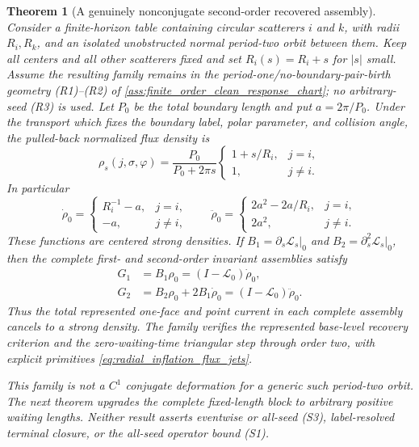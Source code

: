 \documentclass[11pt]{amsart}
\theoremstyle{compactplain}
\newtheorem{theorem}{Theorem}[section]
\theoremstyle{compactdefinition}
\theoremstyle{compactremark}
\newcommand{\Ltransfer}{\mathscr L}
\begin{document}
\begin{theorem}[A genuinely nonconjugate second-order recovered assembly]
\label{thm:radial_inflation_second_order_recovery}
Consider a finite-horizon table containing circular scatterers \(i\) and
\(k\), with radii \(R_i,R_k\), and an isolated unobstructed normal period-two
orbit between them.  Keep all centers and all other scatterers fixed and set
\(R_i(s)=R_i+s\) for \(|s|\) small.  Assume the resulting family remains in
the period-one/no-boundary-pair-birth geometry (R1)--(R2) of
\cref{ass:finite_order_clean_response_chart}; no arbitrary-seed (R3) is used.
Let \(P_0\) be the total
boundary length and put \(a=2\pi/P_0\).  Under the transport which fixes the
boundary label, polar parameter, and collision angle, the pulled-back
normalized flux density is
\begin{equation}
\label{eq:radial_inflation_flux_density}
 \rho_s(j,\sigma,\varphi)
 =\frac{P_0}{P_0+2\pi s}
 \begin{cases}
  1+s/R_i,&j=i,\\
  1,&j\ne i.
 \end{cases}
\end{equation}
In particular
\begin{equation}
\label{eq:radial_inflation_flux_jets}
 \dot\rho_0=
 \begin{cases}R_i^{-1}-a,&j=i,\\-a,&j\ne i,
 \end{cases}
 \qquad
 \ddot\rho_0=
 \begin{cases}2a^2-2a/R_i,&j=i,\\2a^2,&j\ne i.
 \end{cases}
\end{equation}
These functions are centered strong densities.  If
\(B_1=\partial_s\Ltransfer_s|_0\) and
\(B_2=\partial_s^2\Ltransfer_s|_0\), then the complete first- and second-order
invariant assemblies satisfy
\begin{align}
 G_1&=B_1\rho_0=(I-\Ltransfer_0)\dot\rho_0,
 \label{eq:radial_inflation_first_recovery}\\
 G_2&=B_2\rho_0+2B_1\dot\rho_0
      =(I-\Ltransfer_0)\ddot\rho_0.
 \label{eq:radial_inflation_second_recovery}
\end{align}
Thus the total represented one-face and point current in each complete
assembly cancels to a strong density.  The family verifies the represented
base-level recovery criterion and the zero-waiting-time triangular step through order
two, with explicit primitives \eqref{eq:radial_inflation_flux_jets}.

This family is not a \(C^1\) conjugate deformation for a generic such
period-two orbit.  The next theorem upgrades the \emph{complete fixed-length
block} to arbitrary positive waiting lengths.  Neither result asserts
eventwise or all-seed (S3), label-resolved terminal closure, or the all-seed
operator bound (S1).
\end{theorem}
\end{document}
